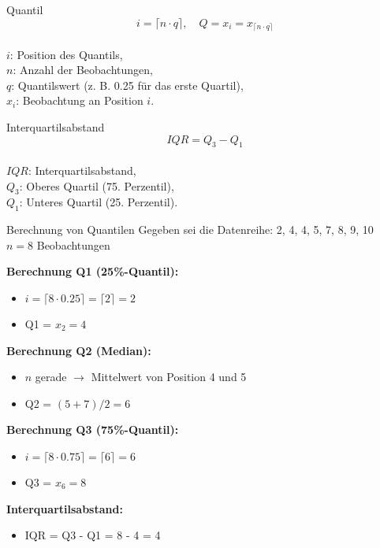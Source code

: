 \begin{minipage}{0.5\columnwidth}
\begin{definition}{Quantil}\\
$$
i=\lceil n \cdot q\rceil, \quad Q=x_{i}=x_{\lceil n \cdot q\rceil}
$$
\\
$i$: Position des Quantils, \\
$n$: Anzahl der Beobachtungen, \\
$q$: Quantilswert (z. B. 0.25 für das erste Quartil), \\
$x_{i}$: Beobachtung an Position $i$.
\end{definition}
\end{minipage}
\begin{minipage}{0.5\columnwidth}
\begin{definition}{Interquartilsabstand}\\
$$
I Q R=Q_{3}-Q_{1}
$$
\\
$IQR$: Interquartilsabstand, \\
$Q_{3}$: Oberes Quartil (75. Perzentil), \\
$Q_{1}$: Unteres Quartil (25. Perzentil).
\end{definition}
\end{minipage}

\begin{example2}{Berechnung von Quantilen}
Gegeben sei die Datenreihe: 2, 4, 4, 5, 7, 8, 9, 10\\
$n = 8$ Beobachtungen

\textbf{Berechnung Q1 (25\%-Quantil):}
\begin{itemize}
    \item $i = \lceil 8 \cdot 0.25 \rceil = \lceil 2 \rceil = 2$
    \item Q1 = $x_2 = 4$
\end{itemize}

\textbf{Berechnung Q2 (Median):}
\begin{itemize}
    \item $n$ gerade $\rightarrow$ Mittelwert von Position 4 und 5
    \item Q2 = $(5 + 7)/2 = 6$
\end{itemize}

\textbf{Berechnung Q3 (75\%-Quantil):}
\begin{itemize}
    \item $i = \lceil 8 \cdot 0.75 \rceil = \lceil 6 \rceil = 6$
    \item Q3 = $x_6 = 8$
\end{itemize}

\textbf{Interquartilsabstand:}
\begin{itemize}
    \item IQR = Q3 - Q1 = 8 - 4 = 4
\end{itemize}
\end{example2}

